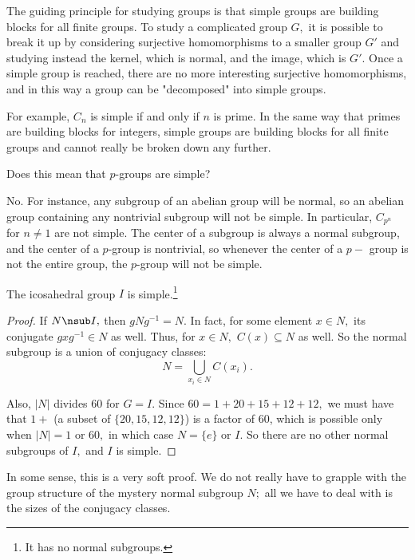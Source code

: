 The guiding principle for studying groups is that simple groups are building blocks for all finite groups. To study a complicated group $G,$ it is possible to break it up by considering surjective homomorphisms to a smaller group $G'$ and studying instead the kernel, which is normal, and the image, which is $G'.$ Once a simple group is reached, there are no more interesting surjective homomorphisms, and in this way a group can be "decomposed" into simple groups.

For example, $C_n$ is simple if and only if $n$ is prime. In the same way that primes are building blocks for integers, simple groups are building blocks for all finite groups and cannot really be broken down any further.

\begin{question}
Does this mean that $p$-groups are simple? 
\end{question}

\begin{ans}
No. For instance, any subgroup of an abelian group will be normal, so an abelian group containing any nontrivial subgroup will not be simple. In particular, $C_{p^n}$ for $n \neq 1$ are not simple. The center of a subgroup is always a normal subgroup, and the center of a $p$-group is nontrivial, so whenever the center of a $p-$ group is not the entire group, the $p$-group will not be simple.
\end{ans}

\begin{theorem}
The icosahedral group $I$ is simple.\footnote{It has no normal subgroups.}
\end{theorem}

\begin{proof}
If $N \nsub I,$ then $gNg^{-1} = N.$ In fact, for some element $x \in N,$ its conjugate $gxg^{-1} \in N$ as well. Thus, for $x \in N,$ $C(x) \subseteq N$ as well. So the normal subgroup is a union of conjugacy classes:
\[
N = \bigcup_{x_i \in N} C(x_i).
\]

Also, $|N|$ divides 60 for $G = I.$ Since $60 = 1 + 20 + 15 + 12 + 12,$ we must have that $1 + $ (a subset of $\{20, 15, 12, 12\}$) is a factor of 60, which is possible only when $|N| = 1$ or $60,$ in which case $N = \{e\}$ or $I.$ So there are no other normal subgroups of $I,$ and $I$ is simple.
\end{proof}

In some sense, this is a very soft proof. We do not really have to grapple with the group structure of the mystery normal subgroup $N;$ all we have to deal with is the sizes of the conjugacy classes. 

